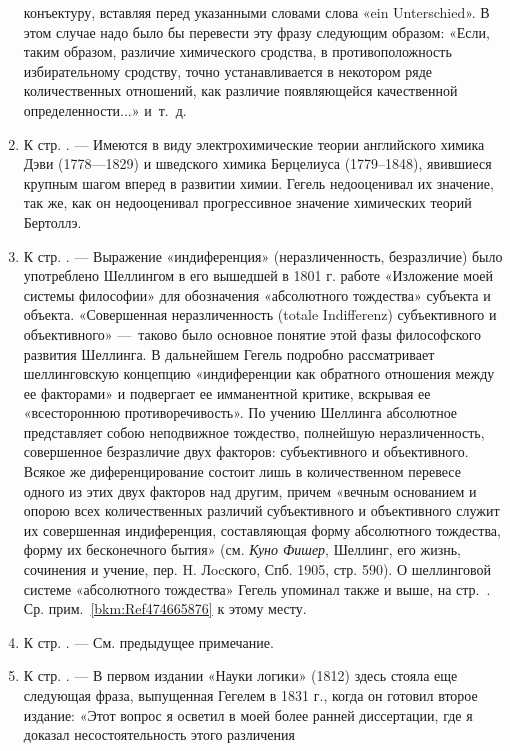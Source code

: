 \begin{enumerate}
конъектуру, вставляя перед указанными словами слова «ein Unterschied». В
этом случае надо было бы перевести эту фразу следующим образом: «Если,
таким образом, различие химического сродства, в противоположность
избирательному сродству, точно устанавливается в некотором ряде
количественных отношений, как различие появляющейся качественной
определенности...» и~т.~д.
\item \label{bkm:Ref474666725}К стр. \pageref{bkm:bm68}. — Имеются в виду
электрохимические теории английского химика Дэви (1778—1829) и шведского
химика Берцелиуса (1779–1848), явившиеся крупным шагом вперед в развитии
химии. Гегель недооценивал их значение, так же, как он недооценивал
прогрессивное значение химических теорий Бертоллэ.
\item \label{bkm:Ref474666740}К стр. \pageref{bkm:bm69}. — Выражение
«индиференция» (неразличенность, безразличие) было употреблено Шеллингом в
его вышедшей в 1801 г. работе «Изложение моей системы философии» для
обозначения «абсолютного тождества» субъекта и объекта. «Совершенная
неразличенность (totale Indifferenz) субъективного и объективного» —~таково
было основное понятие этой фазы философского развития Шеллинга. В
дальнейшем Гегель подробно рассматривает шеллинговскую концепцию
«индиференции как обратного отношения между ее факторами» и подвергает ее
имманентной критике, вскрывая ее «всестороннюю противоречивость». По учению
Шеллинга абсолютное представляет собою неподвижное тождество, полнейшую
неразличенность, совершенное безразличие двух факторов: субъективного и
объективного. Всякое же диференцирование состоит лишь в количественном
перевесе одного из этих двух факторов над другим, причем «вечным основанием
и опорою всех количественных различий субъективного и объективного служит
их совершенная индиференция, составляющая форму абсолютного тождества,
форму их бесконечного бытия» (см. {\em Куно Фишер}, Шеллинг, его жизнь,
сочинения и учение, пер. H. Лocского, Спб. 1905, стр. 590). О шеллинговой
системе «абсолютного тождества» Гегель упоминал также и выше, на
стр.~\pageref{bkm:bm69a}. Ср. прим.~\ref{bkm:Ref474665876} к этому месту.
\item \label{bkm:Ref474666761}К стр. \pageref{bkm:bm70}. — См. предыдущее
примечание.
\item \label{bkm:Ref474666774}К стр. \pageref{bkm:bm71}. — В первом издании
«Науки логики» (1812) здесь стояла еще следующая фраза, выпущенная Гегелем
в 1831 г., когда он готовил второе издание: «Этот вопрос я осветил в моей
более ранней диссертации, где я доказал несостоятельность этого различения

\end{enumerate}
